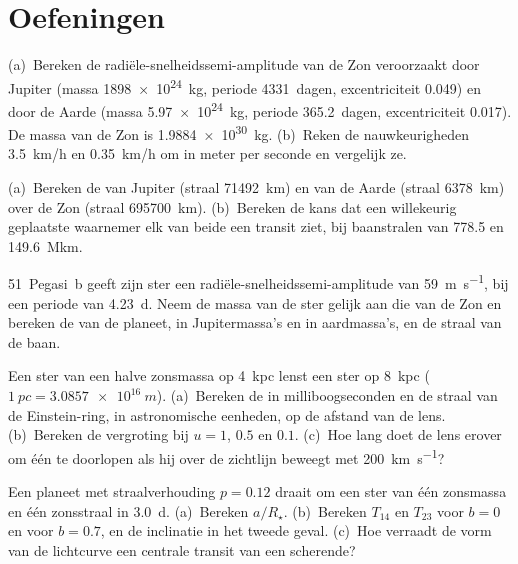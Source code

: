 \section{Oefeningen}

\begin{exercise}[$\star$]\label{exo:b3:exoplanets:1}
(a)~Bereken de radiële-snelheidssemi-amplitude van de Zon veroorzaakt door
Jupiter (massa \qty{1898e24}{kg}, periode \num{4331}~dagen, excentriciteit
0.049) en door de Aarde (massa \qty{5.97e24}{kg}, periode \num{365.2}~dagen,
excentriciteit 0.017). De massa van de Zon is \qty{1.9884e30}{kg}.
(b)~Reken de nauwkeurigheden \qty{3.5}{km/h} en \qty{0.35}{km/h} om in
meter per seconde en vergelijk ze.
\end{exercise}

\begin{exercise}[$\star$]\label{exo:b3:exoplanets:2}
(a)~Bereken de  van Jupiter (straal \qty{71492}{km}) en van
de Aarde (straal \qty{6378}{km}) over de Zon (straal
\qty{695700}{km}). (b)~Bereken de kans dat een willekeurig geplaatste
waarnemer elk van beide een transit ziet, bij baanstralen van \num{778.5}
en \qty{149.6}{\mega km}.
\end{exercise}

\begin{exercise}[$\star$]\label{exo:b3:exoplanets:3}
51~Pegasi~b geeft zijn ster een radiële-snelheidssemi-amplitude van
\qty{59}{m.s^{-1}}, bij een periode van \qty{4.23}{d}. Neem de massa van de
ster gelijk aan die van de Zon en bereken de  van de planeet, in Jupitermassa's
en in aardmassa's, en de straal van de baan.
\end{exercise}

\begin{exercise}[$\star$]\label{exo:b3:exoplanets:4}
Een ster van een halve zonsmassa op \qty{4}{kpc} lenst een ster op
\qty{8}{kpc} ($\qty{1}{pc} = \qty{3.0857e16}{m}$). (a)~Bereken de
 in milliboogseconden en de straal van de Einstein-ring,
in astronomische eenheden, op de afstand van de lens. (b)~Bereken de
vergroting bij $u = 1$, $0.5$ en $0.1$. (c)~Hoe lang doet de lens erover om
één  te doorlopen als hij over de zichtlijn beweegt met
\qty{200}{km.s^{-1}}?
\end{exercise}

\begin{exercise}[$\star\star$]\label{exo:b3:exoplanets:5}
Een planeet met straalverhouding $p = 0.12$ draait om een ster van één zonsmassa en
één zonsstraal in \qty{3.0}{d}. (a)~Bereken $a/R_\star$. (b)~Bereken
$T_{14}$ en $T_{23}$ voor $b = 0$ en voor $b = 0.7$, en de inclinatie
in het tweede geval. (c)~Hoe verraadt de vorm van de lichtcurve een
centrale transit van een scherende?
\end{exercise}

